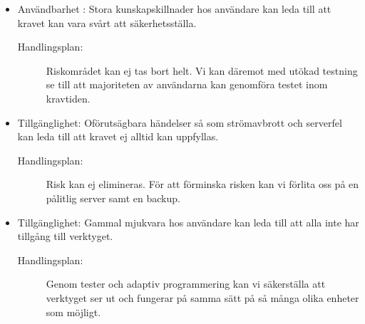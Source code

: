 \documentclass[12pt]{article}
\begin{document}
\begin{itemize}
    \item Användbarhet : Stora kunskapskillnader hos användare kan leda till att kravet kan vara svårt att säkerhetsställa.
    \begin{description}
          \item[Handlingsplan:] Riskområdet kan ej tas bort helt. Vi kan däremot med utökad testning se till att majoriteten av användarna kan genomföra testet inom kravtiden.
    \end{description}
        \item Tillgänglighet: Oförutsägbara händelser så som strömavbrott och serverfel kan leda till att kravet ej alltid kan uppfyllas. 
        \begin{description}
          \item [Handlingsplan:] Risk kan ej elimineras. För att förminska risken kan vi förlita oss på en pålitlig server samt en backup.
    \end{description}
        \item Tillgänglighet: Gammal mjukvara hos användare kan leda till att alla inte har tillgång till verktyget.
        \begin{description}
          \item[Handlingsplan:] Genom tester och adaptiv programmering kan vi säkerställa att verktyget ser ut och fungerar på samma sätt på så många olika enheter som möjligt.
    \end{description}
   

\end{itemize}
\end{document}
